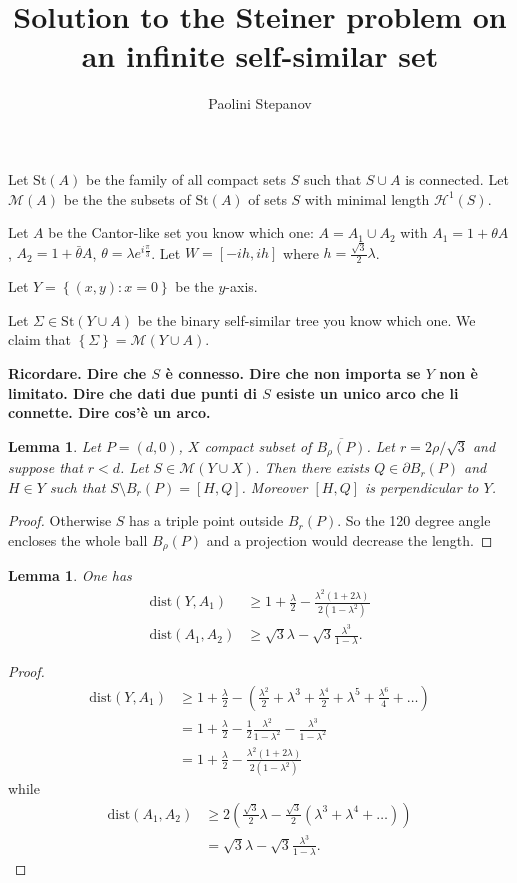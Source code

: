 \documentclass{article}
\title{Solution to the Steiner problem on an infinite self-similar set}
\author{Paolini Stepanov}
\renewcommand{\H}{\mathcal H}
\newcommand{\enclose}[1]{\left(#1\right)}
\newcommand{\ENCLOSE}[1]{\left\{#1\right\}}
\newcommand{\St}{\mathrm{St}}
\newcommand{\M}{\mathcal{M}}
\renewcommand{\H}{\mathcal{H}}
\newcommand{\dist}{\mathrm{dist}}
\newtheorem{lemma}[theorem]{Lemma}
\theoremstyle{definition}
\theoremstyle{remark}
\begin{document}
\maketitle
Let $\St(A)$ be the family of all compact sets $S$ such that 
$S\cup A$ is connected.
Let $\M(A)$ be the the subsets of $\St(A)$ of sets $S$ 
with minimal length $\H^1(S)$.

Let $A$ be the Cantor-like set you know which one: $A=A_1\cup A_2$ 
with $A_1 = 1+\theta A$, $A_2 = 1+\bar \theta A$,
$\theta = \lambda e^{i \frac \pi 3}$.
Let $W=[-ih,ih]$ where $h=\frac{\sqrt{3}} 2 \lambda$.

Let $Y=\ENCLOSE{(x,y)\colon x=0}$ be the $y$-axis.

Let $\Sigma\in \St(Y\cup A)$ be the binary self-similar 
tree you know which one.
We claim that $\ENCLOSE{\Sigma} = \M(Y\cup A)$.

\textbf{Ricordare. Dire che $S$ è connesso. 
Dire che non importa se $Y$ non è limitato.
Dire che dati due punti di $S$ esiste un unico arco che li connette.
Dire cos'è un arco. }

\begin{lemma}
Let $P=(d,0)$, $X$ compact subset of $\overline{B_\rho(P)}$.
Let $r=2\rho/\sqrt 3$ and suppose that $r<d$.
Let $S \in \M(Y\cup X)$.
Then there exists $Q\in \partial B_r(P)$ and $H\in Y$
such that $S\setminus B_r(P) = [H,Q]$.
Moreover $[H,Q]$ is perpendicular to $Y$.
\end{lemma}
\begin{proof}
    Otherwise $S$ has a triple point outside $B_r(P)$.
    So the 120 degree angle encloses the whole ball $B_\rho(P)$ 
    and a projection would decrease the length.
\end{proof}

\begin{lemma}\label{lm:precedente1}
One has
\begin{align*}
    \dist(Y,A_1) & \ge 
    1+ \frac{\lambda} 2 
    - \frac{\lambda^2(1+2\lambda)}{2(1-\lambda^2)}\\
    \dist(A_1,A_2) & 
    \ge 
    \sqrt 3 \lambda - \sqrt 3 \frac{\lambda^3}{1-\lambda}.
\end{align*}
\end{lemma}
\begin{proof}
  \begin{align*}
  \dist(Y,A_1) &\ge 1+ \frac \lambda 2 
     - \enclose{\frac{\lambda^2}{2} 
      + \lambda^3 
      + \frac{\lambda^4 }{2}
      + \lambda^5
      + \frac{\lambda^6}{4} + \dots}\\
      &= 1 + \frac \lambda 2 
      - \frac{1}{2}\frac{\lambda^2}{1-\lambda^2}
      - \frac{\lambda^3}{1-\lambda^2}\\
      &= 1+ \frac{\lambda} 2 
      - \frac{\lambda^2(1+2\lambda)}{2(1-\lambda^2)}
  \end{align*}
  while 
  \begin{align*}
    \dist(A_1,A_2)
    &\ge 2\enclose{\frac{\sqrt 3}{2} \lambda 
      -\frac{\sqrt 3}{2}\enclose{\lambda^3 + \lambda^4 + \dots}
     }\\
    &= \sqrt 3 \lambda -\sqrt 3 \frac{\lambda^3}{1-\lambda}.
  \end{align*}
\end{proof}
\end{document}
